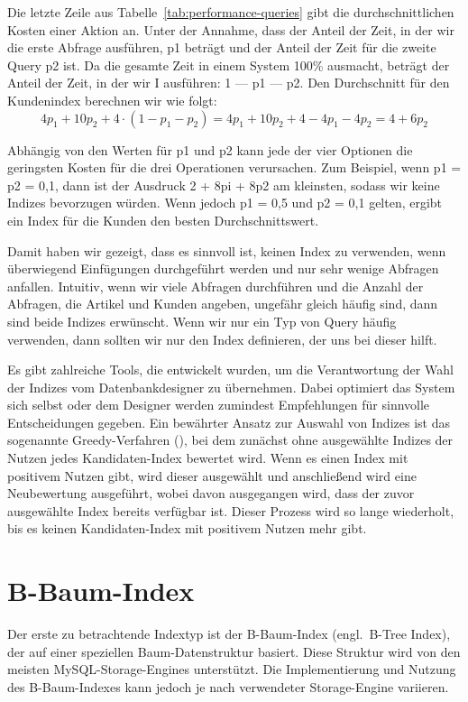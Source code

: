 Die letzte Zeile aus Tabelle~\ref{tab:performance-queries} gibt die durchschnittlichen Kosten einer Aktion an.
Unter der Annahme, dass der Anteil der Zeit, in der wir die erste Abfrage ausführen, p1 beträgt und der Anteil der Zeit für die zweite Query p2 ist.
Da die gesamte Zeit in einem System 100\% ausmacht, beträgt der Anteil der Zeit, in der wir I ausführen: 1 — p1 — p2.
Den Durchschnitt für den Kundenindex berechnen wir wie folgt:
\[
    4p_{1} + 10p_{2} + 4 \cdot (1 - p_{1} - p_{2}) = 4p_{1} + 10p_{2} + 4 - 4p_{1} - 4p_{2} = 4 + 6p_{2}
\]

Abhängig von den Werten für p1 und p2 kann jede der vier Optionen die geringsten Kosten für die drei Operationen verursachen.
Zum Beispiel, wenn p1 = p2 = 0,1, dann ist der Ausdruck 2 + 8pi + 8p2 am kleinsten, sodass wir keine Indizes bevorzugen würden.
Wenn jedoch p1 = 0,5 und p2 = 0,1 gelten, ergibt ein Index für die Kunden den besten Durchschnittswert.

Damit haben wir gezeigt, dass es sinnvoll ist, keinen Index zu verwenden, wenn überwiegend Einfügungen durchgeführt werden und nur sehr wenige Abfragen anfallen.
Intuitiv, wenn wir viele Abfragen durchführen und die Anzahl der Abfragen, die Artikel und Kunden angeben, ungefähr gleich häufig sind, dann sind beide Indizes erwünscht.
Wenn wir nur ein Typ von Query häufig verwenden, dann sollten wir nur den Index definieren, der uns bei dieser hilft.

Es gibt zahlreiche Tools, die entwickelt wurden, um die Verantwortung der Wahl der Indizes vom Datenbankdesigner zu übernehmen.
Dabei optimiert das System sich selbst oder dem Designer werden zumindest Empfehlungen für sinnvolle Entscheidungen gegeben.
Ein bewährter Ansatz zur Auswahl von Indizes ist das sogenannte Greedy-Verfahren (\cite{greedy_varfahren}), bei dem zunächst ohne ausgewählte Indizes der Nutzen jedes Kandidaten-Index bewertet wird.
Wenn es einen Index mit positivem Nutzen gibt, wird dieser ausgewählt und anschließend wird eine Neubewertung ausgeführt, wobei davon ausgegangen wird, dass der zuvor ausgewählte Index bereits verfügbar ist.
Dieser Prozess wird so lange wiederholt, bis es keinen Kandidaten-Index mit positivem Nutzen mehr gibt.

\newpage
\section{B-Baum-Index}\label{sec:indexing-b-baum-index}

Der erste zu betrachtende Indextyp ist der B-Baum-Index (engl.\ B-Tree Index), der auf einer speziellen Baum-Datenstruktur basiert.
Diese Struktur wird von den meisten MySQL-Storage-Engines unterstützt.
Die Implementierung und Nutzung des B-Baum-Indexes kann jedoch je nach verwendeter Storage-Engine variieren.

